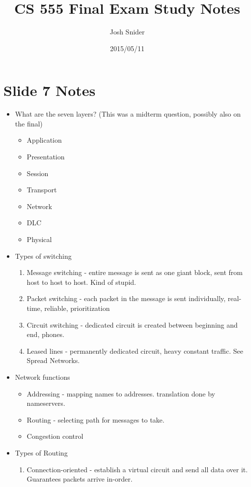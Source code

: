 \documentclass{scrartcl}
\begin{document}
\title{CS 555 Final Exam Study Notes}
\author{Josh Snider}
\date{2015/05/11}
\maketitle
\section*{Slide 7 Notes}
\begin{itemize}
\item What are the seven layers? (This was a midterm question, possibly also on
 the final)
\begin{itemize}
\item Application
\item Presentation
\item Session
\item Transport
\item Network
\item DLC
\item Physical
\end{itemize}
\item Types of switching
\begin{enumerate}
\item Message switching - entire message is sent as one giant block, sent from 
host to host to host. Kind of stupid.
\item Packet switching - each packet in the message is sent individually, 
real-time, reliable, prioritization
\item Circuit switching - dedicated circuit is created between beginning and 
end, phones.
\item Leased lines - permanently dedicated circuit, heavy constant traffic. 
See Spread Networks.
\end{enumerate}
\item Network functions
\begin{itemize}
\item Addressing - mapping names to addresses. translation done by nameservers.
\item Routing - selecting path for messages to take.
\item Congestion control
\end{itemize}
\item Types of Routing
\begin{enumerate}
\item Connection-oriented - establish a virtual circuit and send all data over 
it. Guarantees packets arrive in-order.

\end{enumerate}
\end{itemize}
\end{document}
